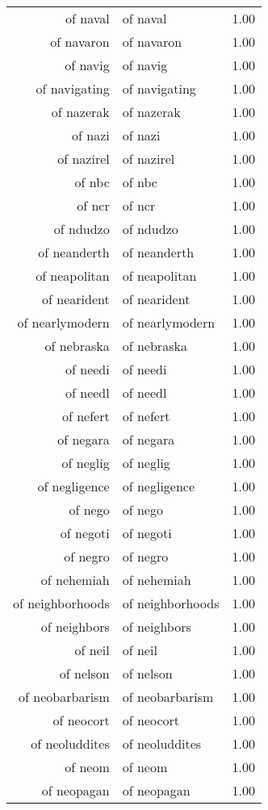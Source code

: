\begin{table}[ht]
\begin{tabular}{rlr}
  of naval & of naval & 1.00 \\ 
  of navaron & of navaron & 1.00 \\ 
  of navig & of navig & 1.00 \\ 
  of navigating & of navigating & 1.00 \\ 
  of nazerak & of nazerak & 1.00 \\ 
  of nazi & of nazi & 1.00 \\ 
  of nazirel & of nazirel & 1.00 \\ 
  of nbc & of nbc & 1.00 \\ 
  of ncr & of ncr & 1.00 \\ 
  of ndudzo & of ndudzo & 1.00 \\ 
  of neanderth & of neanderth & 1.00 \\ 
  of neapolitan & of neapolitan & 1.00 \\ 
  of nearident & of nearident & 1.00 \\ 
  of nearlymodern & of nearlymodern & 1.00 \\ 
  of nebraska & of nebraska & 1.00 \\ 
  of needi & of needi & 1.00 \\ 
  of needl & of needl & 1.00 \\ 
  of nefert & of nefert & 1.00 \\ 
  of negara & of negara & 1.00 \\ 
  of neglig & of neglig & 1.00 \\ 
  of negligence & of negligence & 1.00 \\ 
  of nego & of nego & 1.00 \\ 
  of negoti & of negoti & 1.00 \\ 
  of negro & of negro & 1.00 \\ 
  of nehemiah & of nehemiah & 1.00 \\ 
  of neighborhoods & of neighborhoods & 1.00 \\ 
  of neighbors & of neighbors & 1.00 \\ 
  of neil & of neil & 1.00 \\ 
  of nelson & of nelson & 1.00 \\ 
  of neobarbarism & of neobarbarism & 1.00 \\ 
  of neocort & of neocort & 1.00 \\ 
  of neoluddites & of neoluddites & 1.00 \\ 
  of neom & of neom & 1.00 \\ 
  of neopagan & of neopagan & 1.00 \\ 

\end{tabular}
\end{table}
